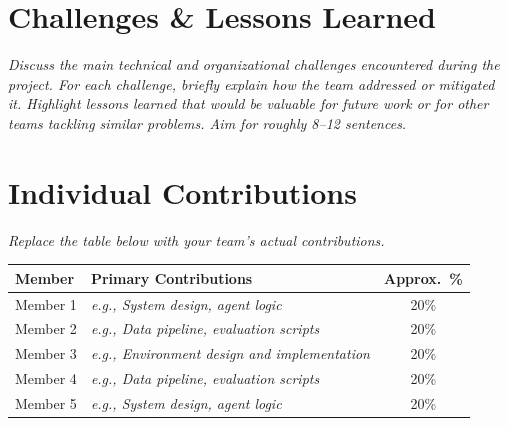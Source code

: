 \documentclass[11pt, letterpaper]{article}
\newcommand{\placeholder}[1]{\textcolor{placeholder}{\textit{#1}}}
\begin{document}
\section{Challenges \& Lessons Learned}
\begin{tcolorbox}[sectionbox, height=4.4cm, valign=top]
  \placeholder{%
    Discuss the main technical and organizational challenges
    encountered during the project. For each challenge, briefly
    explain how the team addressed or mitigated it.
    Highlight lessons learned that would be valuable for future
    work or for other teams tackling similar problems.
    Aim for roughly 8--12 sentences.}
\end{tcolorbox}

\section{Individual Contributions}
\begin{tcolorbox}[sectionbox, height=4.3cm, valign=top]
  \placeholder{Replace the table below with your team's actual contributions.}

  \vspace{4pt}
  \centering
  \begin{tabularx}{0.95\textwidth}{l X c}
    \toprule
    \textbf{Member} & \textbf{Primary Contributions} & \textbf{Approx.\ \%} \\
    \midrule
    Member 1 & \placeholder{e.g., System design, agent logic}          & 20\% \\
    Member 2 & \placeholder{e.g., Data pipeline, evaluation scripts}   & 20\% \\
    Member 3 & \placeholder{e.g., Environment design and implementation} & 20\% \\
    Member 4 & \placeholder{e.g., Data pipeline, evaluation scripts}  & 20\% \\
    Member 5 & \placeholder{e.g., System design, agent logic}  & 20\% \\
    \bottomrule
  \end{tabularx}
\end{tcolorbox}

\end{document}
